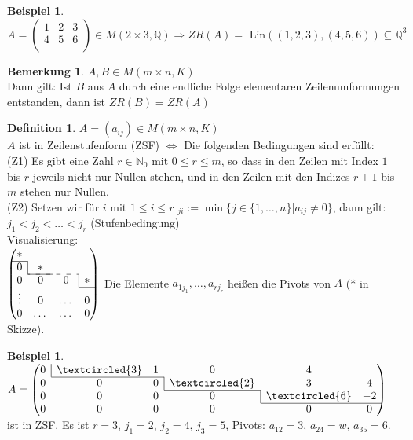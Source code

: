 \documentclass[10pt,a4paper,numbers=endperiod]{scrartcl}
\theoremstyle{definition}
\newtheorem{defi}[satz]{Definition}
\newtheorem{bem}[satz]{Bemerkung}
\newtheorem{bsp}[satz]{Beispiel}
\def\QQ{{\mathbb Q}}
\def\NN{{\mathbb N}}
\begin{document}
\begin{bsp}
	$A = \begin{pmatrix}
	1&2&3\\
	4&5&6\\
	\end{pmatrix} \in M(2 \times 3, \QQ) \Rightarrow ZR(A) = \text{ Lin}((1,2,3), (4,5,6)) \subseteq \QQ^3$
\end{bsp}

\begin{bem}
	$A,B \in M(m \times n, K)$\\
	Dann gilt: Ist $B$ aus $A$ durch eine endliche Folge elementaren Zeilenumformungen entstanden, dann ist $ZR(B)= ZR(A)$
\end{bem}	

\begin{defi}
	$A=(a_{ij}) \in M(m\times n, K)$\\
	$A$ ist in Zeilenstufenform (ZSF) $\Leftrightarrow$ Die folgenden Bedingungen sind erfüllt:\\
	(Z1) Es gibt eine Zahl $r \in \NN_0$ mit $0 \leq r \leq m$, so dass in den Zeilen mit Index $1$ bis $r$ jeweils nicht nur Nullen stehen, und in den Zeilen mit den Indizes $r+1$ bis $m$ stehen nur Nullen.\\
	(Z2) Setzen wir für $i$ mit $1 \leq i \leq r$ $_{ji} := \min\{j \in \{1, \ldots, n\}|a_{ij} \neq 0\}$, dann gilt: $j_1 <j_2<\ldots < j_r$ (Stufenbedingung)\\
	Visualisierung:\\ 
	$\begin{pmatrix}
	*&&&\\
	\cline{1-1}
	0 & \multicolumn{1}{|c}{*}&&\\
	\cline{2-2}\cdashline{2-3}
	0&0&0&\multicolumn{1}{|c}{*}\\
	\cline{4-4}
	\vdots&0&\dots&0\\
	0&\dots&\dots&0\\
	\end{pmatrix}$
	Die Elemente $a_{1j_1},\ldots, a_{rj_r}$ heißen die Pivots von $A$ (* in Skizze).
\end{defi}

\begin{bsp}
	$ $ \\
	$A = \begin{pmatrix}
	0&\multicolumn{1}{|c}{\textcircled{3}}&1&0&4\\
	\cline{2-3}
	0 &0&0& \multicolumn{1}{|c}{\textcircled{2}}&3&4\\
	\cline{4-4}
	0&0&0&0&\multicolumn{1}{|c}{\textcircled{6}}&-2\\
	\cline{5-6}
	0&0&0&0&0&0\\
	\end{pmatrix}$\\
	
	ist in ZSF. Es ist $r=3$, $j_1=2$, $j_2=4$, $j_3=5$, Pivots: $a_{12}=3$, $a_{24}=w$, $a_{35}=6$.
\end{bsp}
\end{document}
